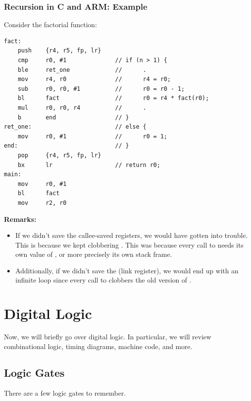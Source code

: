 \documentclass[letterpaper]{article}
\begin{document}
\subsubsection{Recursion in C and ARM: Example}
Consider the factorial function:
\begin{verbatim}
fact:
    push    {r4, r5, fp, lr}
    cmp     r0, #1              // if (n > 1) {
    ble     ret_one             //      .
    mov     r4, r0              //      r4 = r0; 
    sub     r0, r0, #1          //      r0 = r0 - 1;
    bl      fact                //      r0 = r4 * fact(r0);
    mul     r0, r0, r4          //      .
    b       end                 // }
ret_one:                        // else {
    mov     r0, #1              //      r0 = 1;
end:                            // }
    pop     {r4, r5, fp, lr}
    bx      lr                  // return r0; 
main: 
    mov     r0, #1 
    bl      fact 
    mov     r2, r0 
\end{verbatim}
\textbf{Remarks:}
\begin{itemize}
    \item If we didn't save the callee-saved registers, we would have gotten into trouble. This is because we kept clobbering . This was because every call to  needs its own value of , or more precisely its own stack frame.
    \item Additionally, if we didn't save the  (link register), we would end up with an infinite loop since every call to  clobbers the old version of . 
\end{itemize}


\newpage 

\section{Digital Logic}
Now, we will briefly go over digital logic. In particular, we will review combinational logic, timing diagrams, machine code, and more.

\subsection{Logic Gates}
There are a few logic gates to remember.
\end{document}
